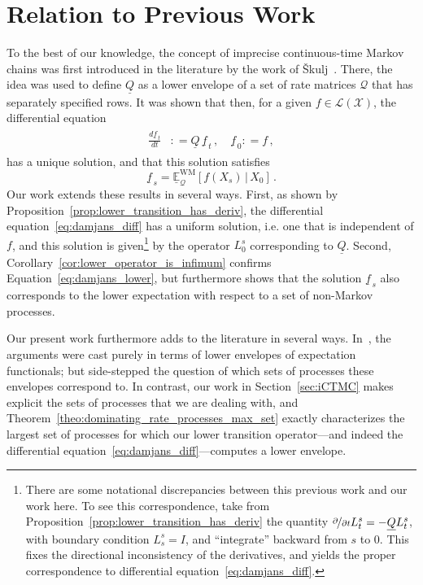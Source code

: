 \documentclass[10pt]{paper}
\theoremstyle{definition}
\newcommand{\states}{\mathcal{X}}
\newcommand{\gambles}{\mathcal{L}}
\newcommand{\gamblesX}{\gambles(\states)}
\newcommand{\rateset}{\mathcal{Q}}
\newcommand{\lrate}{\underline{Q}}
\newcommand{\coloneqq}{:\!=}
\begin{document}
\section{Relation to Previous Work}\label{sec:prev_work}

To the best of our knowledge, the concept of imprecise continuous-time Markov chains was first introduced in the literature by the work of {\v{S}}kulj~\cite{Skulj:2015cq}. There, the idea was used to define $\lrate$ as a lower envelope of a set of rate matrices $\rateset$ that has separately specified rows. It was shown that then, for a given $f\in\gamblesX$, the differential equation
\begin{align}\label{eq:damjans_diff}
\begin{split}
\frac{d \underline{f}_{\,t}}{d t} &\coloneqq \lrate\,\underline{f}_{\,t}\,,\quad
\underline{f}_{\,0} \coloneqq f\,,
\end{split}
\end{align}
has a unique solution, and that this solution satisfies
\begin{equation}\label{eq:damjans_lower}
\underline{f}_{\,s} = \underline{\mathbb{E}}_{\rateset}^{\mathrm{WM}}[f(X_s)\,\vert\,X_0]\,.
\end{equation}
Our work extends these results in several ways. First, as shown by Proposition~\ref{prop:lower_transition_has_deriv}, the differential equation~\eqref{eq:damjans_diff} has a uniform solution, i.e. one that is independent of $f$, and this solution is given\footnote{There are some notational discrepancies between this previous work and our work here. To see this correspondence, take from Proposition~\ref{prop:lower_transition_has_deriv} the quantity $\nicefrac{\partial}{\partial t}L_t^s=-\lrate L_t^s$, with boundary condition $L_s^s=I$, and ``integrate'' backward from $s$ to $0$. This fixes the directional inconsistency of the derivatives, and yields the proper correspondence to differential equation~\eqref{eq:damjans_diff}.} by the operator $L_0^s$ corresponding to $\lrate$. Second, Corollary~\ref{cor:lower_operator_is_infimum} confirms Equation~\eqref{eq:damjans_lower}, but furthermore shows that the solution $\underline{f}_{\,s}$ also corresponds to the lower expectation with respect to a set of non-Markov processes.

Our present work furthermore adds to the literature in several ways. In~\cite{Skulj:2015cq}, the arguments were cast purely in terms of lower envelopes of expectation functionals; but side-stepped the question of which sets of processes these envelopes correspond to. In contrast, our work in Section~\ref{sec:iCTMC} makes explicit the sets of processes that we are dealing with, and Theorem~\ref{theo:dominating_rate_processes_max_set} exactly characterizes the largest set of processes for which our lower transition operator---and indeed the differential equation~\eqref{eq:damjans_diff}---computes a lower envelope.
\end{document}
